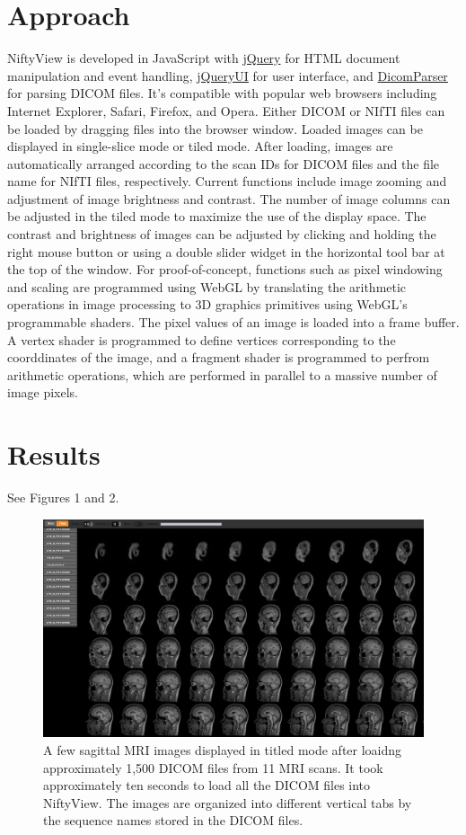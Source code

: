 \documentclass[twocolumn]{bmcart}%
\begin{document}
\section{Approach}\label{approach}

NiftyView is developed in JavaScript with
\href{http://jquery.com}{jQuery} for HTML document manipulation and
event handling, \href{http://jqueryui.com}{jQueryUI} for user interface,
and \href{https://github.com/chafey/dicomParser}{DicomParser} for
parsing DICOM files. It's compatible with popular web browsers including
Internet Explorer, Safari, Firefox, and Opera. Either DICOM or NIfTI
files can be loaded by dragging files into the browser window. Loaded
images can be displayed in single-slice mode or tiled mode. After
loading, images are automatically arranged according to the scan IDs for
DICOM files and the file name for NIfTI files, respectively. Current
functions include image zooming and adjustment of image brightness and
contrast. The number of image columns can be adjusted in the tiled mode
to maximize the use of the display space. The contrast and brightness of
images can be adjusted by clicking and holding the right mouse button or
using a double slider widget in the horizontal tool bar at the top of
the window. For proof-of-concept, functions such as pixel windowing and
scaling are programmed using WebGL by translating the arithmetic
operations in image processing to 3D graphics primitives using WebGL's
programmable shaders. The pixel values of an image is loaded into a
frame buffer. A vertex shader is programmed to define vertices
corresponding to the coorddinates of the image, and a fragment shader is
programmed to perfrom arithmetic operations, which are performed in
parallel to a massive number of image pixels.

\section{Results}\label{results}

See Figures 1 and 2.

\begin{figure}[h!]
  \includegraphics[width=.47\textwidth]{niftyview_ui}
  \caption{\label{centfig}
  A few sagittal MRI images displayed in titled mode after loaidng approximately 1,500 DICOM files from 11 MRI scans. It took approximately ten seconds to load all the DICOM files into NiftyView. The images are organized into different vertical tabs by the sequence names stored in the DICOM files.}
\end{figure}
\end{document}
